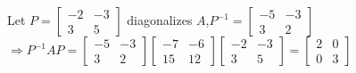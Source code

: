 \documentclass[12pt]{book}
\begin{document}
\begin{CJK}{UTF8}{bsmi}
\begin{minipage}[t]{\dimexpr\linewidth}
Let $P=\begin{bmatrix}
-2 & -3 \\
3 & 5
\end{bmatrix}$ diagonalizes $A$,\quad$P^{-1}=\begin{bmatrix}
-5 & -3 \\
3 & 2
\end{bmatrix}$ \\
$\Rightarrow P^{-1}AP=\begin{bmatrix}
-5 & -3 \\
3 & 2
\end{bmatrix}\begin{bmatrix}
-7 & -6 \\
15 & 12
\end{bmatrix}\begin{bmatrix}
-2 & -3 \\
3 & 5
\end{bmatrix}=\begin{bmatrix}
2 & 0 \\
0 & 3
\end{bmatrix}$
\end{minipage} \\


\end{CJK}
\end{document}
